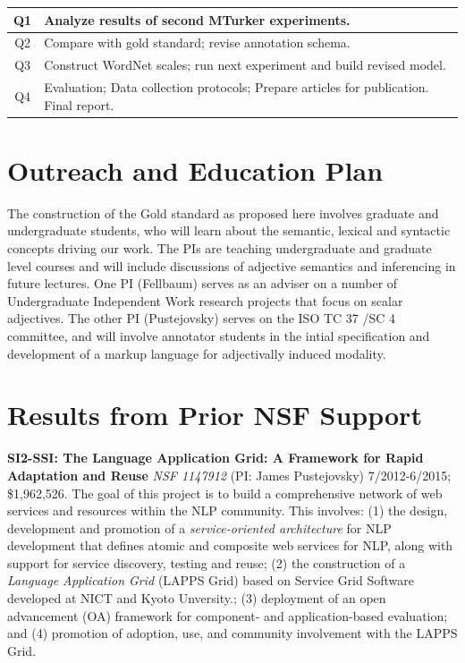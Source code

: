 \documentclass[10pt]{article}
\newcommand{\miniskip}{\vspace*{1mm}}
\begin{document}
\vspace{1mm}\noindent
{\small
\begin{tabularx}{470pt}{|c|X|}

\hline

Q1 & Analyze results of second MTurker experiments.\\

\hline

Q2 & Compare with gold standard; revise annotation schema.  \\

\hline

Q3 &   Construct WordNet scales; run next experiment and build revised model. \\

\hline

Q4 &  Evaluation; Data collection protocols; Prepare articles for publication.  Final report.\\

\hline

\end{tabularx}
}



\section{Outreach and Education Plan}
The construction of the Gold standard as proposed here involves graduate and undergraduate students, who will learn about the semantic, lexical 
and syntactic concepts driving our work. The PIs are teaching undergraduate and graduate level courses and will include discussions of 
adjective semantics and inferencing in future lectures. One PI (Fellbaum) serves as an adviser on a number of Undergraduate Independent 
Work research projects that focus on scalar adjectives. The other PI (Pustejovsky) serves on the ISO TC 37 /SC 4 committee, and will involve annotator students in  the intial specification  and development of a markup language for adjectivally induced modality. 

 

\section{Results from Prior NSF Support}


\miniskip\noindent
 {\bf SI2-SSI: The Language Application Grid: A Framework for Rapid Adaptation and Reuse} 
{\it NSF 1147912} (PI: James Pustejovsky) 7/2012-6/2015; \$1,962,526.
The goal of this  project is to  build  a comprehensive network of web services and resources within the NLP community. This involves:
(1) the design, development  and promotion of a {\it service-oriented architecture} for NLP development that defines atomic and composite web services for NLP, along with support for service discovery, testing and reuse; (2)  the construction of a {\it Language Application Grid} (LAPPS Grid) based on Service Grid Software developed at NICT and Kyoto Unversity.; (3)  deployment of an open advancement (OA) framework for
component- and application-based evaluation; and  (4)  promotion of adoption, use, and community involvement with the LAPPS Grid.  
\end{document}
